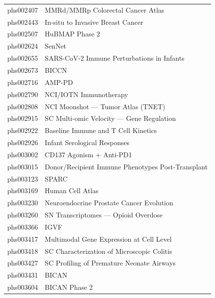 \documentclass[11pt,letterpaper]{article}
\begin{document}
{\begin{longtable}{@{} l p{10cm} @{}}
phs002407 & MMRd/MMRp Colorectal Cancer Atlas \\
phs002443 & In-situ to Invasive Breast Cancer \\
phs002507 & HuBMAP Phase 2 \\
phs002624 & SenNet \\
phs002655 & SARS-CoV-2 Immune Perturbations in Infants \\
phs002673 & BICCN \\
phs002716 & AMP-PD \\
phs002790 & NCI/IOTN Immunotherapy \\
phs002808 & NCI Moonshot --- Tumor Atlas (TNET) \\
phs002915 & SC Multi-omic Velocity --- Gene Regulation \\
phs002922 & Baseline Immune and T Cell Kinetics \\
phs002926 & Infant Serological Responses \\
phs003002 & CD137 Agonism + Anti-PD1 \\
phs003015 & Donor/Recipient Immune Phenotypes Post-Transplant \\
phs003123 & SPARC \\
phs003169 & Human Cell Atlas \\
phs003230 & Neuroendocrine Prostate Cancer Evolution \\
phs003260 & SN Transcriptomes --- Opioid Overdose \\
phs003366 & IGVF \\
phs003417 & Multimodal Gene Expression at Cell Level \\
phs003418 & SC Characterization of Microscopic Colitis \\
phs003427 & SC Profiling of Premature Neonate Airways \\
phs003431 & BICAN \\
phs003604 & BICAN Phase 2 \\
\bottomrule
\end{longtable}
}
\end{document}
